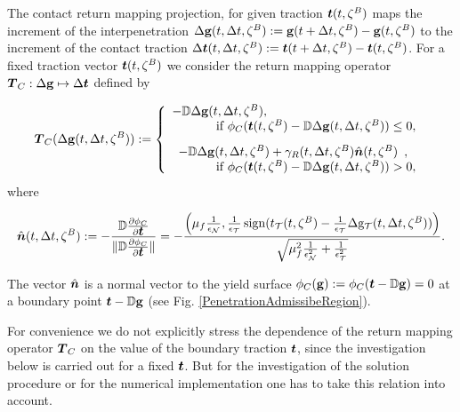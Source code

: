 \documentclass[12pt,a4paper]{scrbook}
\begin{document}
The contact return mapping projection, for given traction $\mbox{\boldmath$t$}(t,\zeta^{B})$ maps the increment of the interpenetration $\Delta \mbox{\boldmath$\mathrm{g}$}(t,\Delta t,\zeta^{B}):=\mbox{\boldmath$\mathrm{g}$}(t+\Delta t,\zeta^{B})-\mbox{\boldmath$\mathrm{g}$}(t,\zeta^{B})$ to the increment of the contact traction $\Delta \mbox{\boldmath$t$}(t,\Delta t,\zeta^{B}):=\mbox{\boldmath$t$}(t+\Delta t,\zeta^{B})-\mbox{\boldmath$t$}(t,\zeta^{B})$. For a fixed traction vector $\mbox{\boldmath$t$}(t,\zeta^{B})$  we consider the return mapping operator $\mbox{\boldmath$T$}_{C}: \Delta \mbox{\boldmath$\mathrm{g}$} \mapsto \Delta \mbox{\boldmath$t$}$  defined by

\begin{equation}\label{ContactReturnMaping}
\bv{T}_{C}(\Delta \bv{\gap}(t,\Delta t,\zeta^{\sl})):= \left\{
\begin{array}{lc}
-\D \Delta \bv{\gap}(t,\Delta t,\zeta^{\sl}), & \\ &\hspace{-6cm}\mbox{ if } \yieldf_{C}(\bv{t}(t,\zeta^{\sl})-\D \Delta\bv{\gap}(t,\Delta t,\zeta^{\sl})) \leq 0, \\[2ex]
\begin{array}{l}-\D \Delta \bv{\gap}(t,\Delta t,\zeta^{\sl}) + \gamma_R (t,\Delta t,\zeta^{\sl})\hat{\bv{n}}(t,\zeta^{\sl})\end{array}, & \\ &\hspace{-6cm}\mbox{ if } \yieldf_{C}(\bv{t}(t,\zeta^{\sl})-\D \Delta\bv{\gap}(t,\Delta t,\zeta^{\sl})) > 0,
\end{array}
\right.
\end{equation}
where

\begin{equation}
\hat{\mbox{\boldmath$n$}}(t,\Delta t,\zeta^{B}):=-\frac{{\mathbb D}  \frac{\partial \phi_{C}}{\partial \mbox{\boldmath$t$}} }{\| {\mathbb D}\frac{ \partial\phi_{C}}{\partial \mbox{\boldmath$t$}}\|}=-\frac{  \left(\mu_{f}  \frac{1}{\epsilon_{{\mathcal{N}}}},\frac{1}{\epsilon_{{\mathcal{T}}}} \mathop{\rm sign}\nolimits(t_{{\mathcal{T}}}(t,\zeta^{B})-\frac{1}{\epsilon_{{\mathcal{T}}}} \Delta \mathrm{g}_{{\mathcal{T}}}(t,\Delta t,\zeta^{B}) )\right)  }{\sqrt{\mu_{f}^2  \frac{1}{\epsilon_{{\mathcal{N}}}^2} + \frac{1}{\epsilon_{{\mathcal{T}}}^2} }}.
\end{equation}


The vector $\hat{\mbox{\boldmath$n$}}$ is a normal vector to the yield surface $\phi_{C}(\mbox{\boldmath$\mathrm{g}$}):=\phi_{C}(\mbox{\boldmath$t$}-{\mathbb D} \mbox{\boldmath$\mathrm{g}$})=0$ at a boundary point $\mbox{\boldmath$t$}-{\mathbb D} \mbox{\boldmath$\mathrm{g}$}$ (see Fig. \ref{PenetrationAdmissibeRegion}).

\begin{remark}
For convenience we do not explicitly stress the dependence of the return mapping operator $\mbox{\boldmath$T$}_{C}$ on the value of the boundary traction $\mbox{\boldmath$t$}$, since the investigation below is carried out for a fixed $\mbox{\boldmath$t$}$. But for the investigation of the solution procedure or for the numerical implementation one has to take this relation into account.
\end{remark}
\end{document}
